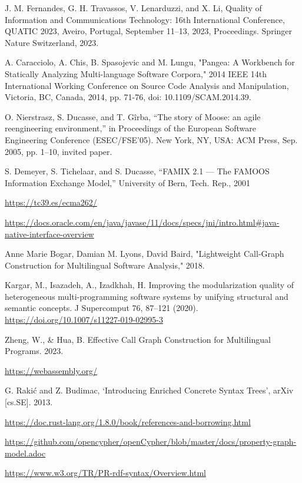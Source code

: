\begin{thebibliography}{00}
    J. M. Fernandes, G. H. Travassos, V. Lenarduzzi, and X. Li, 
    Quality of Information and Communications Technology: 
    16th International Conference, QUATIC 2023,
    Aveiro, Portugal, September 11--13, 2023,
    Proceedings. Springer Nature Switzerland, 2023.

    A. Caracciolo, A. Chis, B. Spasojevic and
    M. Lungu, "Pangea: A Workbench for Statically Analyzing Multi-language Software Corpora,"
    2014 IEEE 14th International Working Conference on Source Code Analysis
    and Manipulation, Victoria, BC, Canada, 2014,
    pp. 71-76, doi: 10.1109/SCAM.2014.39.

    O. Nierstrasz, S. Ducasse, and T. Gîrba, “The story of Moose: an
    agile reengineering environment,” in Proceedings of the European
    Software Engineering Conference (ESEC/FSE’05). New York, NY,
    USA: ACM Press, Sep. 2005, pp. 1–10, invited paper.

    S. Demeyer, S. Tichelaar, and S. Ducasse, “FAMIX 2.1 — The FAMOOS
    Information Exchange Model,” University of Bern, Tech. Rep., 2001

    \url{https://tc39.es/ecma262/}

    \url{https://docs.oracle.com/en/java/javase/11/docs/specs/jni/intro.html#java-native-interface-overview}

    Anne Marie Bogar, Damian M. Lyons, David Baird,
    "Lightweight Call-Graph Construction for Multilingual Software Analysis," 2018.

    Kargar, M., Isazadeh, A., Izadkhah, H.
    Improving the modularization quality of heterogeneous multi-programming software systems by unifying structural and semantic concepts.
    J Supercomput 76, 87–121 (2020). \url{https://doi.org/10.1007/s11227-019-02995-3}

    Zheng, W., \& Hua, B. Effective Call Graph Construction for Multilingual Programs. 2023.

    \url{https://webassembly.org/}

    G. Rakić and Z. Budimac, ‘Introducing Enriched Concrete Syntax Trees’, arXiv [cs.SE]. 2013.

    \url{https://doc.rust-lang.org/1.8.0/book/references-and-borrowing.html}

    \url{https://github.com/opencypher/openCypher/blob/master/docs/property-graph-model.adoc}

    \url{https://www.w3.org/TR/PR-rdf-syntax/Overview.html}

\end{thebibliography}
\endgroup

\clearpage
